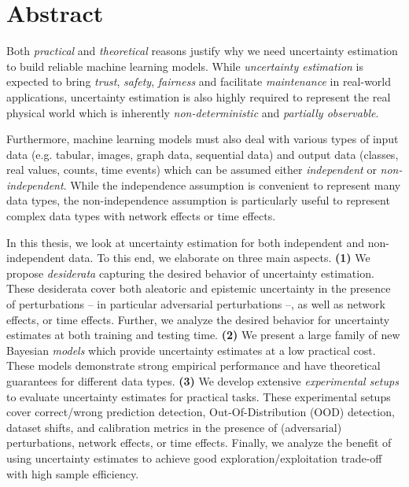 \chapter*{Abstract}
%

Both \emph{practical} and \emph{theoretical} reasons justify why we need uncertainty estimation to build reliable machine learning models. While \emph{uncertainty estimation} is expected to bring \emph{trust}, \emph{safety}, \emph{fairness} and facilitate \emph{maintenance} in real-world applications, uncertainty estimation is also highly required to represent the real physical world which is inherently \emph{non-deterministic} and \emph{partially observable}. 

Furthermore, machine learning models must also deal with various types of input data (e.g. tabular, images, graph data, sequential data) and output data (classes, real values, counts, time events) which can be assumed either \emph{independent} or \emph{non-independent}. While the independence assumption is convenient to represent many data types, the non-independence assumption is particularly useful to represent complex data types with network effects or time effects.

In this thesis, we look at uncertainty estimation for both independent and non-independent data. To this end, we elaborate on three main aspects. \textbf{(1)} We propose \emph{desiderata} capturing the desired behavior of uncertainty estimation. These desiderata cover both aleatoric and epistemic uncertainty in the presence of perturbations -- in particular adversarial perturbations --, as well as network effects, or time effects. Further, we analyze the desired behavior for uncertainty estimates at both training and testing time. \textbf{(2)} We present a large family of new Bayesian \emph{models} which provide uncertainty estimates at a low practical cost. These models demonstrate strong empirical performance and have theoretical guarantees for different data types. \textbf{(3)} We develop extensive \emph{experimental setups} to evaluate uncertainty estimates for practical tasks. These experimental setups cover correct/wrong prediction detection, Out-Of-Distribution (OOD) detection, dataset shifts, and calibration metrics in the presence of (adversarial) perturbations, network effects, or time effects. Finally, we analyze the benefit of using uncertainty estimates to achieve good exploration/exploitation trade-off with high sample efficiency.
